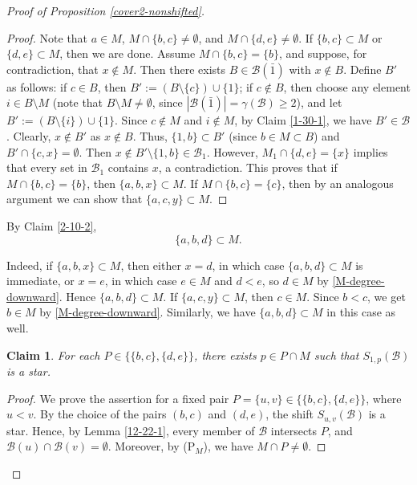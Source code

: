 \documentclass[a4paper,11pt]{article}
\newtheorem{claim}[theorem]{Claim}
\newcommand{\m}{\mathcal}
\begin{document}
\begin{proof}[Proof of Proposition \ref{cover2-nonshifted}]
\begin{proof}
Note that $a\in M$, $M\cap \{b,c\}\ne \emptyset$, and $M\cap \{d,e\}\ne \emptyset$.
If $\{b,c\}\subset M$ or $\{d,e\}\subset M$, then we are done. 
Assume $M\cap \{b,c\}=\{b\}$, and suppose, for contradiction, that $x\not\in M$. Then there exists $B\in \m B(\bar{1})$ with $x\not\in B$. Define $B'$ as follows: if $c\in B$, then $B':=(B\setminus \{c\})\cup \{1\}$; if $c\not\in B$, then choose any element $i\in B\setminus M$ (note that $B\setminus M\ne \emptyset$, since $|\m B(\bar1)|=\gamma(\m B)\ge 2$), and let $B':=(B\setminus \{i\})\cup \{1\}$. Since $c\not\in M$ and $i\not\in M$, 
by Claim \ref{1-30-1}, we have $B'\in \m B$. Clearly, $x\not\in B'$ as $x\not\in B$. 
Thus, $\{1,b\}\subset B'$ (since $b\in M\subset B$) and $B'\cap \{c,x\}=\emptyset$. Then $x\not\in B'\setminus \{1,b\}\in \m B_1$. 
However, $M_1\cap \{d,e\}=\{x\}$ implies that every set in $\m B_1$ contains $x$, a contradiction. This proves that if $M\cap \{b,c\}=\{b\}$, then $\{a,b,x\}\subset M$. If $M\cap \{b,c\}=\{c\}$, then by an analogous argument we can show that $\{a,c,y\}\subset M$.
\end{proof}

By Claim \ref{2-10-2}, 
\begin{equation*}
\{a,b,d\}\subset M.
\end{equation*}

Indeed, if $\{a,b,x\}\subset M$, then either $x=d$, in which case
$\{a,b,d\}\subset M$ is immediate, or $x=e$, in which case $e\in M$ and
$d<e$, so $d\in M$ by \eqref{M-degree-downward}. Hence
$\{a,b,d\}\subset M$.
If $\{a,c,y\}\subset M$, then $c\in M$. Since $b<c$, we get
$b\in M$ by \eqref{M-degree-downward}. Similarly, we have $\{a,b,d\}\subset M$ in this case as well.



\begin{claim}\label{bcdestar} 
For each $P\in\{\{b,c\},\{d,e\}\}$, there exists
$p\in P\cap M$ such that $S_{1,p}(\mathcal B)$ is a star. 
\end{claim}



\begin{proof}
We prove the assertion for a fixed pair
$P=\{u,v\}\in\{\{b,c\},\{d,e\}\}$,
where $u<v$. By the choice of the pairs $(b,c)$ and $(d,e)$, the shift
$S_{u,v}(\mathcal B)$ is a star. Hence, by Lemma \ref{12-22-1}, every
member of $\mathcal B$ intersects $P$, and $\mathcal B(u)\cap\mathcal B(v)=\emptyset.$
Moreover, by (P$_M$), we have
$M\cap P\ne\emptyset$.


\end{proof}
\end{proof}
\end{document}
